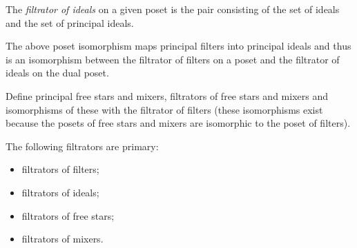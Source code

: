\begin{defn}
The \emph{filtrator of ideals} on a given poset is the pair consisting
of the set of ideals and the set of principal ideals.

The above poset isomorphism maps principal filters into principal
ideals and thus is an isomorphism between the filtrator of filters
on a poset and the filtrator of ideals on the dual poset.\end{defn}
\begin{xca}
Define principal free stars and mixers, filtrators of free stars and
mixers and isomorphisms of these with the filtrator of filters (these
isomorphisms exist because the posets of free stars and mixers are
isomorphic to the poset of filters).\end{xca}
\begin{obvious}
The following filtrators are primary:
\begin{itemize}
\item filtrators of filters;
\item filtrators of ideals;
\item filtrators of free stars;
\item filtrators of mixers.
\end{itemize}
\end{obvious}

